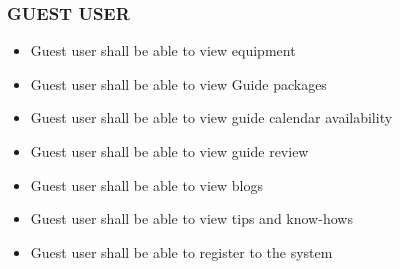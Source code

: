 \subsubsection*{GUEST USER}
\begin{itemize}
\itemsep0em 
    \item Guest user shall be able to view equipment
    \item Guest user shall be able to view Guide packages
    \item Guest user shall be able to view guide calendar availability
    \item Guest user shall be able to view guide review
    \item Guest user shall be able to view blogs
    \item Guest user shall be able to view tips and know-hows
    \item Guest user shall be able to register to the system
    \\
    \\
    \\
    \\\\\\
    \\
    \\
    \\
    \\
    \\
    \\
    \\
\end{itemize}


\clearpage
